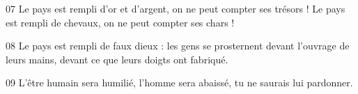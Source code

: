 
07 Le pays est rempli d’or et d’argent, on ne peut compter ses trésors ! Le pays est rempli de chevaux, on ne peut compter ses chars !

08 Le pays est rempli de faux dieux : les gens se prosternent devant l’ouvrage de leurs mains, devant ce que leurs doigts ont fabriqué.

09 L’être humain sera humilié, l’homme sera abaissé, tu ne saurais lui pardonner.